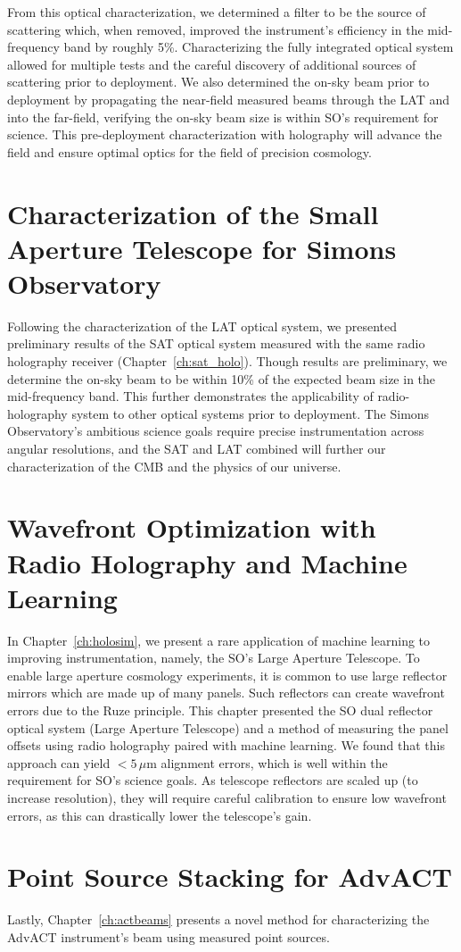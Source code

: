 From this optical characterization, we determined a filter to be the source of scattering which, when removed, improved the instrument's efficiency in the mid-frequency band by roughly 5\%.  Characterizing the fully integrated optical system allowed for multiple tests and the careful discovery of additional sources of scattering prior to deployment.  We also determined the on-sky beam prior to deployment by propagating the near-field measured beams through the LAT and into the far-field, verifying the on-sky beam size is within SO's requirement for science.  This pre-deployment characterization with holography will advance the field and ensure optimal optics for the field of precision cosmology.

\section{Characterization of the Small Aperture Telescope for Simons Observatory}
Following the characterization of the LAT optical system, we presented preliminary results of the SAT optical system measured with the same radio holography receiver (Chapter~\ref{ch:sat_holo}).  Though results are preliminary, we determine the on-sky beam to be within 10\% of the expected beam size in the mid-frequency band.  This further demonstrates the applicability of radio-holography system to other optical systems prior to deployment.  The Simons Observatory's ambitious science goals require precise instrumentation across angular resolutions, and the SAT and LAT combined will further our characterization of the CMB and the physics of our universe.

\section{Wavefront Optimization with Radio Holography and Machine Learning}

In Chapter~\ref{ch:holosim}, we present a rare application of machine learning to improving instrumentation, namely, the SO's Large Aperture Telescope.  To enable large aperture cosmology experiments, it is common to use large reflector mirrors which are made up of many panels.  Such reflectors can create wavefront errors due to the Ruze principle.  This chapter presented the SO dual reflector optical system (Large Aperture Telescope) and a method of measuring the panel offsets using radio holography paired with machine learning.  We found that this approach can yield $<5\,\mu$m alignment errors, which is well within the requirement for SO's science goals.  As telescope reflectors are scaled up (to increase resolution), they will require careful calibration to ensure low wavefront errors, as this can drastically lower the telescope's gain.

\section{Point Source Stacking for AdvACT}
Lastly, Chapter~\ref{ch:actbeams} presents a novel method for characterizing the AdvACT instrument's beam using measured point sources. 